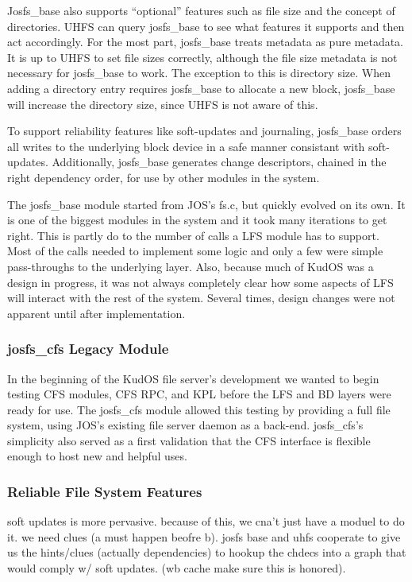 Josfs\_base also supports ``optional'' features such as file size and the
concept of directories. UHFS can query josfs\_base to see what features it
supports and then act accordingly. For the most part, josfs\_base treats
metadata as pure metadata. It is up to UHFS to set file sizes correctly,
although the file size metadata is not necessary for josfs\_base to work. The
exception to this is directory size. When adding a directory entry requires
josfs\_base to allocate a new block, josfs\_base will increase the directory
size, since UHFS is not aware of this.

To support reliability features like soft-updates and journaling, josfs\_base
orders all writes to the underlying block device in a safe manner consistant
with soft-updates. Additionally, josfs\_base generates change descriptors,
chained in the right dependency order, for use by other modules in the system.

The josfs\_base module started from JOS's fs.c, but quickly evolved on its own.
It is one of the biggest modules in the system and it took many iterations to
get right. This is partly do to the number of calls a LFS module has to support.
Most of the calls needed to implement some logic and only a few were simple
pass-throughs to the underlying layer. Also, because much of KudOS was a design
in progress, it was not always completely clear how some aspects of LFS will
interact with the rest of the system. Several times, design changes were not
apparent until after implementation.

\subsubsection{josfs\_cfs Legacy Module}

In the beginning of the KudOS file server's development we wanted to begin
testing CFS modules, CFS RPC, and KPL before the LFS and BD layers were ready
for use. The josfs\_cfs module allowed this testing by providing a full file
system, using JOS's existing file server daemon as a back-end. josfs\_cfs's
simplicity also served as a first validation that the CFS interface is flexible
enough to host new and helpful uses.

\subsubsection{Reliable File System Features}

soft updates is more pervasive. because of this, we cna't just have a
moduel to do it. we need clues (a must happen beofre b). josfs base
and uhfs cooperate to give us the hints/clues (actually dependencies)
to hookup the chdecs into a graph that would comply w/ soft
updates. (wb cache make sure this is honored).


